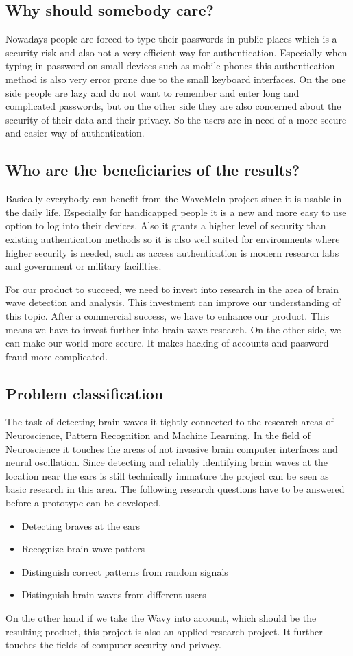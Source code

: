 \documentclass[a4paper,11pt]{article}
\begin{document}
\subsection{Why should somebody care?}
Nowadays people are forced to type their passwords in public places which is a security risk and also not a very efficient way for authentication. Especially when typing in password on small devices such as mobile phones this authentication method is also very error prone due to the small keyboard interfaces. On the one side people are lazy and do not want to remember and enter long and complicated passwords, but on the other side they are also concerned about the security of their data and their privacy. So the users are in need of a more secure and easier way of authentication.

\subsection{Who are the beneficiaries of the results?}
Basically everybody can benefit from the WaveMeIn project since it is usable in the daily life. Especially for handicapped people it is a new and more easy to use option to log into their devices. Also it grants a higher level of security than existing authentication methods so it is also well suited for environments where higher security is needed, such as access authentication is modern research labs and government or military facilities.

For our product to succeed, we need to invest into research in the area of brain wave detection and analysis. This investment can improve our understanding of this topic. After a commercial success, we have to enhance our product. This means we have to invest further into brain wave research. On the other side, we can make our world more secure. It makes hacking of accounts and password fraud more complicated.

\subsection{Problem classification}
The task of detecting brain waves it tightly connected to the research areas of Neuroscience, Pattern Recognition and Machine Learning. In the field of Neuroscience it touches the areas of not invasive brain computer interfaces and neural oscillation. Since detecting and reliably identifying brain waves at the location near the ears is still technically immature the project can be seen as basic research in this area. The following research questions have to be answered before a prototype can be developed.
\begin{itemize}
	\item Detecting braves at the ears
	\item Recognize brain wave patters
	\item Distinguish correct patterns from random signals
	\item Distinguish brain waves from different users
\end{itemize}
On the other hand if we take the Wavy into account, which should be the resulting product, this project is also an applied research project. It further touches the fields of computer security and privacy.
\end{document}
